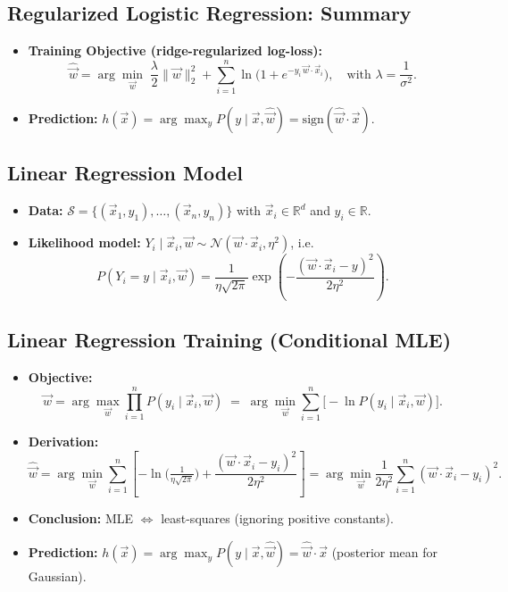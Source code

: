 \subsection{Regularized Logistic Regression: Summary}
\begin{itemize}
    \item \textbf{Training Objective (ridge-regularized log-loss):}
    \[
      \hat{\vec{w}}=\arg\min_{\vec{w}} \;\frac{\lambda}{2}\|\vec{w}\|_2^2
      + \sum_{i=1}^n \ln\!\big(1+e^{-y_i\,\vec{w}\cdot\vec{x}_i}\big),
      \quad \text{with } \lambda=\frac{1}{\sigma^2}.
    \]
    \item \textbf{Prediction:} $h(\vec{x})=\arg\max_{y}P(y\mid \vec{x},\hat{\vec{w}})=\mathrm{sign}(\hat{\vec{w}}\cdot \vec{x})$.
\end{itemize}

\subsection{Linear Regression Model}
\begin{itemize}
    \item \textbf{Data:} $\mathcal{S}=\{(\vec{x}_1,y_1),\ldots,(\vec{x}_n,y_n)\}$ with $\vec{x}_i\in\mathbb{R}^d$ and $y_i\in\mathbb{R}$.
    \item \textbf{Likelihood model:} $Y_i\mid \vec{x}_i,\vec{w}\sim \mathcal{N}(\vec{w}\!\cdot\!\vec{x}_i,\eta^2)$, i.e.
    \[
      P(Y_i=y\mid \vec{x}_i,\vec{w})=\frac{1}{\eta\sqrt{2\pi}}
      \exp\!\left(-\frac{(\vec{w}\!\cdot\!\vec{x}_i-y)^2}{2\eta^2}\right).
    \]
\end{itemize}

\subsection{Linear Regression Training (Conditional MLE)}
\begin{itemize}
    \item \textbf{Objective:}
    \[
      \hat{\vec{w}}=\arg\max_{\vec{w}} \prod_{i=1}^n P(y_i\mid \vec{x}_i,\vec{w})
      \;=\; \arg\min_{\vec{w}} \sum_{i=1}^n \Big[-\ln P(y_i\mid \vec{x}_i,\vec{w})\Big].
    \]
    \item \textbf{Derivation:}
    \[
      \hat{\vec{w}}
      =\arg\min_{\vec{w}} \sum_{i=1}^n \left[-\ln\!\Big(\tfrac{1}{\eta\sqrt{2\pi}}\Big) 
      + \frac{(\vec{w}\!\cdot\!\vec{x}_i-y_i)^2}{2\eta^2}\right]
      =\arg\min_{\vec{w}} \frac{1}{2\eta^2}\sum_{i=1}^n(\vec{w}\!\cdot\!\vec{x}_i-y_i)^2.
    \]
    \item \textbf{Conclusion:} MLE $\Longleftrightarrow$ least-squares (ignoring positive constants).
    \item \textbf{Prediction:} $h(\vec{x})=\arg\max_y P(y\mid \vec{x},\hat{\vec{w}})=\hat{\vec{w}}\!\cdot\!\vec{x}$ (posterior mean for Gaussian).
\end{itemize}

